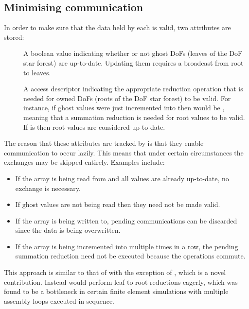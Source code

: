 \documentclass[thesis]{subfiles}
\begin{document}
\subsection{Minimising communication}
\label{sec:parallel_minimising_communication}

In order to make sure that the data held by each  is valid, two attributes are stored:
\begin{description}
  \item[]
    A boolean value indicating whether or not ghost DoFs (leaves of the DoF star forest) are up-to-date.
    Updating them requires a broadcast from root to leaves.

  \item[]
    A  access descriptor indicating the appropriate reduction operation that is needed for owned DoFs (roots of the DoF star forest) to be valid.
    For instance, if ghost values were just incremented into then  would be , meaning that a summation reduction is needed for root values to be valid.
    If  is  then root values are considered up-to-date.
\end{description}

The reason that these attributes are tracked by  is that they enable communication to occur lazily.
This means that under certain circumstances the exchanges may be skipped entirely.
Examples include:
\begin{itemize}
  \item If the array is being read from and all values are already up-to-date, no exchange is necessary.
  \item If ghost values are not being read then they need not be made valid.
  \item If the array is being written to, pending communications can be discarded since the data is being overwritten.
  \item If the array is being incremented into multiple times in a row, the pending summation reduction need not be executed because the operations commute.
\end{itemize}

This approach is similar to that of  with the exception of , which is a novel contribution.
Instead  would perform leaf-to-root reductions eagerly, which was found to be a bottleneck in certain finite element simulations with multiple assembly loops executed in sequence.
\end{document}
